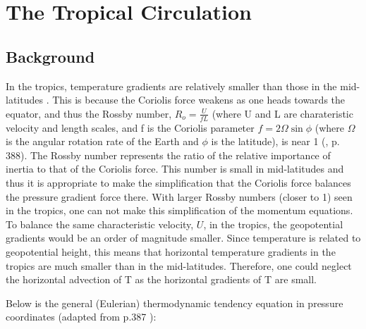 \documentclass[letterpaper,12pt,titlepage,oneside,final]{book}
\begin{document}
\section{The Tropical Circulation}
\subsection{Background}\label{wtg}
In the tropics, temperature gradients are relatively smaller than those in the mid-latitudes \citep{sobel_weak_2001}. This is because the Coriolis force weakens as one heads towards the equator, and thus the Rossby number, $R_{o}=\frac{U}{fL}$ (where U and L are charateristic velocity and length scales, and f is the Coriolis parameter $f=2\Omega\sin{\phi}$ (where $\Omega$ is the angular rotation rate of the Earth and $\phi$ is the latitude), is near 1 (\citep{holton_introduction_2004}, p. 388). The Rossby number represents the ratio of the relative importance of inertia to that of the Coriolis force. This number is small in mid-latitudes and thus it is appropriate to make the simplification that the Coriolis force balances the pressure gradient force there. With larger Rossby numbers (closer to 1) seen in the tropics, one can not make this simplification of the momentum equations. To balance the same characteristic velocity, $U$, in the tropics, the geopotential gradients would be an order of magnitude smaller. Since temperature is related to geopotential height, this means that horizontal temperature gradients in the tropics are much smaller than in the mid-latitudes. Therefore, one could neglect the horizontal advection of T as the horizontal gradients of T are small. 

Below is the general (Eulerian) thermodynamic tendency equation in pressure coordinates (adapted from p.387 \citep{holton_introduction_2004}):
\end{document}

